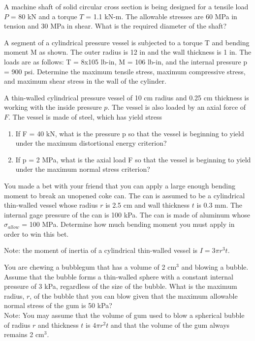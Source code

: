 \documentclass[
10pt,
a4paper,
openany,
svgnames,
]{book} %
\begin{document}
\begin{exercises}
  \exercise A machine shaft of solid circular cross section is being designed for a tensile load $P$ = 80 kN and a torque $T$ = 1.1 kN-m. The allowable stresses are 60 MPa in tension and 30 MPa in shear. What is the required diameter of the shaft?

  \exercise A segment of a cylindrical pressure vessel is subjected to a torque T and bending moment M as shown. The outer radius is 12 in and the wall thickness is 1 in. The loads are as follows: T = 8x105 lb-in, M = 106 lb-in, and the internal pressure p = 900 psi. Determine the maximum tensile stress, maximum compressive stress, and maximum shear stress in the wall of the cylinder.

  \exercise A thin-walled cylindrical pressure vessel of 10 cm radius and 0.25 cm thickness is working with the inside pressure $p$. The vessel is also loaded by an axial force of $F$. The vessel is made of steel, which has yield stress
  \begin{enumerate}
  \item If F = 40 kN, what is the pressure p so that the vessel is beginning to yield under the maximum distortional energy criterion?
  \item If p = 2 MPa, what is the axial load F so that the vessel is beginning to yield under the maximum normal stress criterion?
  \end{enumerate}

  \exercise You made a bet with your friend that you can apply a large enough bending moment to break an unopened coke can. The can is assumed to be a cylindrical thin-walled vessel whose radius $r$ is 2.5 cm and wall thickness $t$ is 0.3 mm. The internal gage pressure of the can is 100 kPa. The can is made of aluminum whose $\sigma_{allow}$ = 100 MPa. Determine how much bending moment you must apply in order to win this bet.
  
  Note: the moment of inertia of a cylindrical thin-walled vessel is $I = 3 \pi r^3 t$.

  \exercise You are chewing a bubblegum that has a volume of 2 cm$^3$ and
  blowing a bubble. Assume that the bubble forms a thin-walled sphere
  with a constant internal pressure of 3 kPa, regardless of the size
  of the bubble. What is the maximum radius, $r$, of the bubble that
  you can blow given that the maximum allowable normal stress of the
  gum is 50 kPa? \\
  Note: You may assume that the volume of gum used to blow a spherical
  bubble of radius $r$ and thickness $t$ is $4\pi r^2 t$ and that the
  volume of the gum always remains 2 cm$^3$.


\end{exercises}
\end{document}
